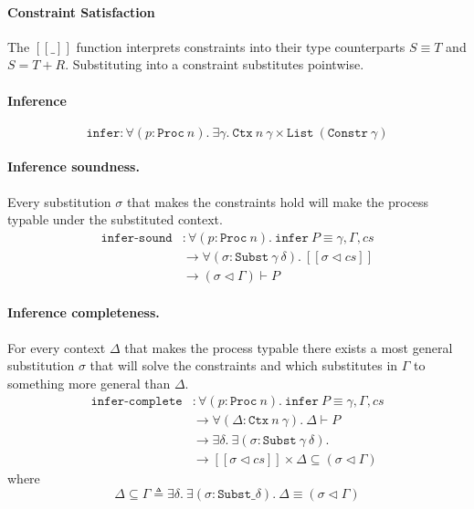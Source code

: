\documentclass[sigplan,screen,review]{acmart}
\begin{document}
\paragraph{Constraint Satisfaction}

The \([\![\_]\!]\) function interprets constraints into their type
counterparts \(S \equiv T\) and \(S = T + R\). Substituting into a
constraint substitutes pointwise.

\paragraph{Inference}

\[
\texttt{infer} : \forall (p : \texttt{Proc}~n). ~ \exists \gamma. ~ \texttt{Ctx}~n~\gamma \times \texttt{List}~(\texttt{Constr}~\gamma)
\]

\paragraph{Inference soundness.}

Every substitution \(\sigma\) that makes the constraints hold will make
the process typable under the substituted context. \[
\begin{aligned}
\texttt{infer-sound} &: \forall (p : \texttt{Proc}~n). ~ \texttt{infer}~P \equiv \gamma , \Gamma , cs \\
&\to \forall (\sigma : \texttt{Subst}~\gamma~\delta). ~ [\![ \sigma \triangleleft cs ]\!] \\
&\to (\sigma \triangleleft \Gamma) \vdash P
\end{aligned}
\]

\paragraph{Inference completeness.}

For every context \(\Delta\) that makes the process typable there exists
a most general substitution \(\sigma\) that will solve the constraints
and which substitutes in \(\Gamma\) to something more general than
\(\Delta\). \[
\begin{aligned}
\texttt{infer-complete} &: \forall (p : \texttt{Proc}~n). ~ \texttt{infer}~P \equiv \gamma , \Gamma , cs \\
&\to \forall (\Delta : \texttt{Ctx}~n~\gamma). ~ \Delta \vdash P \\
&\to \exists \delta. ~ \exists (\sigma : \texttt{Subst}~\gamma~\delta). \\
&\to [\![ \sigma \triangleleft cs ]\!] \times \Delta \subseteq (\sigma \triangleleft \Gamma)
\end{aligned}
\] where \[
\Delta \subseteq \Gamma \triangleq \exists \delta. ~ \exists (\sigma : \texttt{Subst} \_ \delta). ~ \Delta \equiv (\sigma \triangleleft \Gamma)
\]
\end{document}
